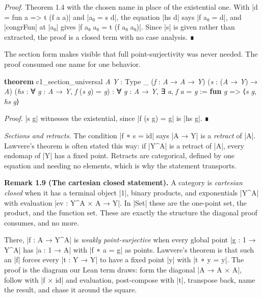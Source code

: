 \documentclass{memoir}
\begin{document}
\emph{Proof.} Theorem 1.4 with the chosen name in place of the existential one. With
\LeanVerb|d = fun a => t (f a a)| and \LeanVerb|a₀ = s d|, the equation \LeanVerb|hs d| says \LeanVerb|f a₀ = d|,
and \LeanVerb|congrFun| at \LeanVerb|a₀| gives \LeanVerb|f a₀ a₀ = t (f a₀ a₀)|. Since \LeanVerb|s| is given rather
than extracted, the proof is a closed term with no case analysis. ∎

The section form makes visible that full point-surjectivity was never needed.
The proof consumed one name for one behavior.

\begin{LeanVerbatim}
\textbf{theorem} c1_section_universal \textit{A} \textit{Y} : Type _ (\textit{f} : \textit{A} → \textit{A} → \textit{Y})
    (\textit{s} : (\textit{A} → \textit{Y}) → \textit{A})
    (\textit{hs} : ∀ \textit{g} : \textit{A} → \textit{Y}, \textit{f} (\textit{s} \textit{g}) = \textit{g}) :
    ∀ \textit{g} : \textit{A} → \textit{Y}, ∃ \textit{a}, \textit{f} \textit{a} = \textit{g} :=
  \textbf{fun} \textit{g} => ⟨\textit{s} \textit{g}, \textit{hs} \textit{g}⟩

\end{LeanVerbatim}


\emph{Proof.} \LeanVerb|s g| witnesses the existential, since \LeanVerb|f (s g) = g| is \LeanVerb|hs g|. ∎

\emph{Sections and retracts.} The condition \LeanVerb|f ∘ s = id| says \LeanVerb|A → Y| is a \emph{retract}
of \LeanVerb|A|. Lawvere's theorem is often stated this way: if \LeanVerb|Y^A| is a retract of
\LeanVerb|A|, every endomap of \LeanVerb|Y| has a fixed point. Retracts are categorical, defined
by one equation and needing no elements, which is why the statement transports.

\textbf{Remark 1.9 (The cartesian closed statement).} A category is \emph{cartesian closed}
when it has a terminal object \LeanVerb|1|, binary products, and exponentials \LeanVerb|Y^A| with
evaluation \LeanVerb|ev : Y^A × A → Y|. In \LeanVerb|Set| these are the one-point set, the
product, and the function set. These are exactly the structure the diagonal
proof consumes, and no more.

There, \LeanVerb|f : A → Y^A| is \emph{weakly point-surjective} when every global point \LeanVerb|g : 1 → Y^A|
has \LeanVerb|a : 1 → A| with \LeanVerb|f ∘ a = g| as points. Lawvere's theorem is that such an
\LeanVerb|f| forces every \LeanVerb|t : Y → Y| to have a fixed point \LeanVerb|y| with \LeanVerb|t ∘ y = y|. The
proof is the diagram our Lean term draws: form the diagonal \LeanVerb|A → A × A|, follow
with \LeanVerb|f × id| and evaluation, post-compose with \LeanVerb|t|, transpose back, name the
result, and chase it around the square.
\end{document}
